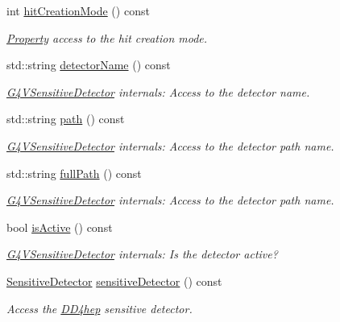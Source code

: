 \begin{DoxyCompactItemize}
int \hyperlink{class_d_d4hep_1_1_simulation_1_1_geant4_sensitive_a31dfbd49f28fadb58f4ede4a916dd1b4}{hit\+Creation\+Mode} () const
\begin{DoxyCompactList}\small\item\em \hyperlink{class_d_d4hep_1_1_property}{Property} access to the hit creation mode. \end{DoxyCompactList}\item 
std\+::string \hyperlink{class_d_d4hep_1_1_simulation_1_1_geant4_sensitive_ab24cad7581e1288f7c3ac3502c81e377}{detector\+Name} () const
\begin{DoxyCompactList}\small\item\em \hyperlink{class_g4_v_sensitive_detector}{G4\+V\+Sensitive\+Detector} internals\+: Access to the detector name. \end{DoxyCompactList}\item 
std\+::string \hyperlink{class_d_d4hep_1_1_simulation_1_1_geant4_sensitive_aafeedad27312aba2b09303bf822bd93e}{path} () const
\begin{DoxyCompactList}\small\item\em \hyperlink{class_g4_v_sensitive_detector}{G4\+V\+Sensitive\+Detector} internals\+: Access to the detector path name. \end{DoxyCompactList}\item 
std\+::string \hyperlink{class_d_d4hep_1_1_simulation_1_1_geant4_sensitive_a327dcac774eca3a0caf8d45cb1a0d322}{full\+Path} () const
\begin{DoxyCompactList}\small\item\em \hyperlink{class_g4_v_sensitive_detector}{G4\+V\+Sensitive\+Detector} internals\+: Access to the detector path name. \end{DoxyCompactList}\item 
bool \hyperlink{class_d_d4hep_1_1_simulation_1_1_geant4_sensitive_a0f316f5254a2c3e724b73ddabd1e39fc}{is\+Active} () const
\begin{DoxyCompactList}\small\item\em \hyperlink{class_g4_v_sensitive_detector}{G4\+V\+Sensitive\+Detector} internals\+: Is the detector active? \end{DoxyCompactList}\item 
\hyperlink{class_d_d4hep_1_1_simulation_1_1_geant4_sensitive_a985a23f6592b3ab41b9aa45e47fbc9ea}{Sensitive\+Detector} \hyperlink{class_d_d4hep_1_1_simulation_1_1_geant4_sensitive_ad08df051040874abe54e8ea0b189ab49}{sensitive\+Detector} () const
\begin{DoxyCompactList}\small\item\em Access the \hyperlink{namespace_d_d4hep}{D\+D4hep} sensitive detector. \end{DoxyCompactList}\item 

\end{DoxyCompactItemize}
